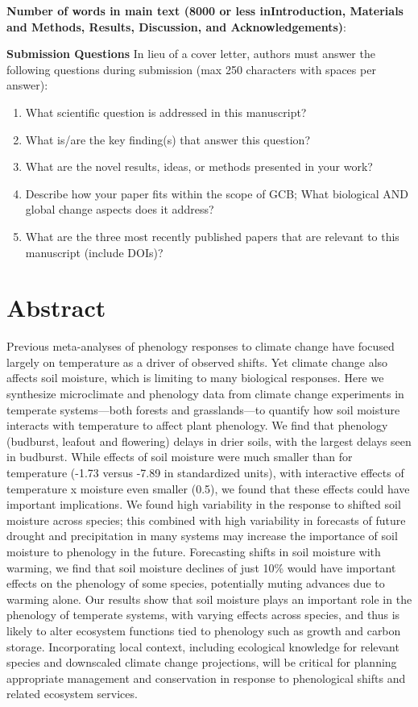 \documentclass{article}
\begin{document}
\textbf{Number of words in main text (8000 or less inIntroduction, Materials and Methods, Results, Discussion, and Acknowledgements)}: 


\textbf{Submission Questions} In lieu of a cover letter, authors must answer the following questions during submission (max 250 characters with spaces per answer):
\begin{enumerate}
\item What scientific question is addressed in this manuscript?
\item What is/are the key finding(s) that answer this question?
\item What are the novel results, ideas, or methods presented in your work?
\item Describe how your paper fits within the scope of GCB; What biological AND global change aspects does it address?
\item What are the three most recently published papers that are relevant to this manuscript (include DOIs)?
\end{enumerate}



\linenumbers

\section*{Abstract} 
Previous meta-analyses of phenology responses to climate change have focused largely on temperature as a driver of observed shifts. Yet climate change also affects soil moisture, which is limiting to many biological responses. Here we synthesize microclimate and phenology data from climate change experiments in temperate systems---both forests and grasslands---to quantify how soil moisture interacts with temperature to affect plant phenology. We find that phenology (budburst, leafout and flowering) delays in drier soils, with the largest delays seen in budburst.  While effects of soil moisture were much smaller than for temperature (-1.73 versus -7.89 in standardized units), with interactive effects of temperature x moisture even smaller (0.5), we found that these effects could have important implications. We found high variability in the response to shifted soil moisture across species; this combined with high variability in forecasts of future drought and precipitation in many systems may increase the importance of soil moisture to phenology in the future. Forecasting shifts in soil moisture with warming, we find that soil moisture declines of just 10\% would have important effects on the phenology of some species, potentially muting advances due to warming alone.  Our results show that soil moisture plays an important role in the phenology of temperate systems, with varying effects across species, and thus is likely to alter ecosystem functions tied to phenology such as growth and carbon storage. Incorporating local context, including ecological knowledge for relevant species and downscaled climate change projections, will be critical for planning appropriate management and conservation in response to phenological shifts and related ecosystem services.
\end{document}
